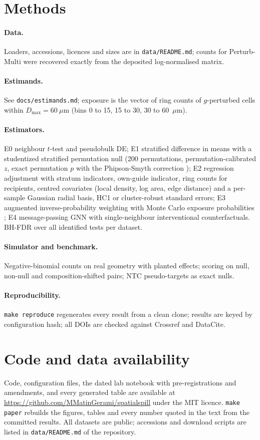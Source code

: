 \documentclass[11pt]{article}
\begin{document}
\section{Methods}
\label{sec:methods}
\paragraph{Data.} Loaders, accessions, licences and sizes are in \texttt{data/README.md};
counts for Perturb-Multi were recovered exactly from the deposited log-normalised matrix.
\paragraph{Estimands.} See \texttt{docs/estimands.md}; exposure is the vector of ring counts of
$g$-perturbed cells within $D_{\max} = 60~\mu$m (bins 0 to 15, 15 to 30, 30 to 60~$\mu$m).
\paragraph{Estimators.} E0 neighbour $t$-test and pseudobulk DE; E1 stratified difference in
means with a studentized stratified permutation null (200 permutations, permutation-calibrated
$z$, exact permutation $p$ with the Phipson-Smyth correction \citep{phipson2010});
E2 regression adjustment with stratum indicators, own-guide indicator, ring counts for
recipients, centred covariates (local density, log area, edge distance) and a per-sample
Gaussian radial basis, HC1 or cluster-robust standard errors; E3 augmented inverse-probability
weighting with Monte Carlo exposure probabilities \citep{aronow2017}; E4 message-passing GNN
with single-neighbour interventional counterfactuals. BH-FDR \citep{benjamini1995} over all
identified tests per dataset.
\paragraph{Simulator and benchmark.} Negative-binomial counts on real geometry with planted
effects; scoring on null, non-null and composition-shifted pairs; NTC pseudo-targets as exact
nulls.
\paragraph{Reproducibility.} \texttt{make reproduce} regenerates every result from a clean
clone; results are keyed by configuration hash; all DOIs are checked against Crossref and DataCite.

\section*{Code and data availability}
Code, configuration files, the dated lab notebook with pre-registrations and amendments, and
every generated table are available at \url{https://github.com/MMatinGerami/spatialspill}
under the MIT licence. \texttt{make paper} rebuilds the figures, tables and every number quoted
in the text from the committed results. All datasets are public; accessions and download
scripts are listed in \texttt{data/README.md} of the repository.
\end{document}
